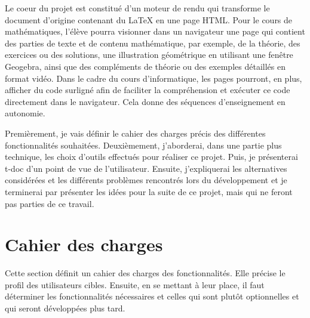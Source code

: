 \documentclass[12pt,titlepage,oneside]{article}
\begin{document}
Le coeur du projet est constitué d'un moteur de rendu qui transforme le document d'origine contenant du LaTeX en une page HTML. Pour le cours de mathématiques, l'élève pourra visionner dans un navigateur une page qui contient des parties de texte et de contenu mathématique, par exemple, de la théorie, des exercices ou des solutions, une illustration géométrique en utilisant une fenêtre Geogebra, ainsi que des compléments de théorie ou des exemples détaillés en format vidéo. Dans le cadre du cours d'informatique, les pages pourront, en plus, afficher du code surligné afin de faciliter la compréhension et exécuter ce code directement dans le navigateur. Cela donne des séquences d'enseignement en autonomie.\par

Premièrement, je vais définir le cahier des charges précis des différentes fonctionnalités souhaitées. Deuxièmement, j’aborderai, dans une partie plus technique, les choix d’outils effectués pour réaliser ce projet. Puis, je présenterai t-doc d’un point de vue de l’utilisateur. Ensuite, j’expliquerai les alternatives considérées et les différents problèmes rencontrés lors du développement et je terminerai par présenter les idées pour la suite de ce projet, mais qui ne feront pas parties de ce travail.\par


\newpage

\section{Cahier des charges}
Cette section définit un cahier des charges des fonctionnalités. Elle précise le profil des utilisateurs cibles. Ensuite, en se mettant à leur place, il faut déterminer les fonctionnalités nécessaires et celles qui sont plutôt optionnelles et qui seront développées plus tard.\par
\end{document}
